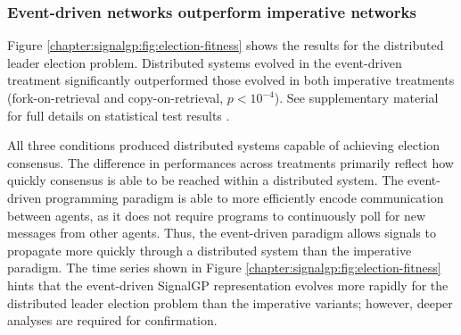 

\subsubsection{Event-driven networks outperform imperative networks}

Figure \ref{chapter:signalgp:fig:election-fitness} shows the results for the distributed leader election problem.
Distributed systems evolved in the event-driven treatment significantly outperformed those evolved in both imperative treatments 
(fork-on-retrieval and copy-on-retrieval, $p<10^{-4}$). 
See supplementary material for full details on statistical test results \citep{signalgp_supplement_2018}. 

All three conditions produced distributed systems capable of achieving election consensus. 
The difference in performances across treatments primarily reflect how quickly consensus is able to be reached within a distributed system. 
The event-driven programming paradigm is able to more efficiently encode communication between agents, as it does not require programs to continuously poll for new messages from other agents. 
Thus, the event-driven paradigm allows signals to propagate more quickly through a distributed system than the imperative paradigm. 
The time series shown in Figure \ref{chapter:signalgp:fig:election-fitness} hints that the event-driven SignalGP representation evolves more rapidly for the distributed leader election problem than the imperative variants; however, deeper analyses are required for confirmation. 

